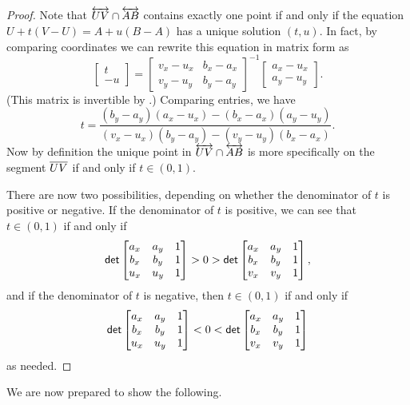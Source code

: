 \begin{proof}
Note that \(\overleftrightarrow{UV} \cap \overleftrightarrow{AB}\) contains exactly one point if and only if the equation \(U + t(V-U) = A + u(B-A)\) has a unique solution \((t,u)\).
In fact, by comparing coordinates we can rewrite this equation in matrix form as \[ \begin{bmatrix} t \\ -u \end{bmatrix} = \begin{bmatrix} v_x - u_x & b_x - a_x \\ v_y - u_y & b_y - a_y \end{bmatrix}^{-1} \begin{bmatrix} a_x - u_x \\ a_y - u_y \end{bmatrix}. \]
(This matrix is invertible by .) Comparing entries, we have \[ t = \frac{(b_y-a_y)(a_x-u_x) - (b_x-a_x)(a_y-u_y)}{(v_x-u_x)(b_y-a_y) - (v_y-u_y)(b_x-a_x)}. \]
Now by definition the unique point in \(\overleftrightarrow{UV} \cap \overleftrightarrow{AB}\) is more specifically on the segment \(\overline{UV}\) if and only if \(t \in (0,1)\).

There are now two possibilities, depending on whether the denominator of \(t\) is positive or negative.
If the denominator of \(t\) is positive, we can see that \(t \in (0,1)\) if and only if \[ \mathsf{det} \begin{bmatrix} a_x & a_y & 1 \\ b_x & b_y & 1 \\ u_x & u_y & 1 \end{bmatrix} > 0 > \mathsf{det} \begin{bmatrix} a_x & a_y & 1 \\ b_x & b_y & 1 \\ v_x & v_y & 1 \end{bmatrix}, \]
and if the denominator of \(t\) is negative, then \(t \in (0,1)\) if and only if \[ \mathsf{det} \begin{bmatrix} a_x & a_y & 1 \\ b_x & b_y & 1 \\ u_x & u_y & 1 \end{bmatrix} < 0 < \mathsf{det} \begin{bmatrix} a_x & a_y & 1 \\ b_x & b_y & 1 \\ v_x & v_y & 1 \end{bmatrix} \] as needed.
\end{proof}

We are now prepared to show the following.

